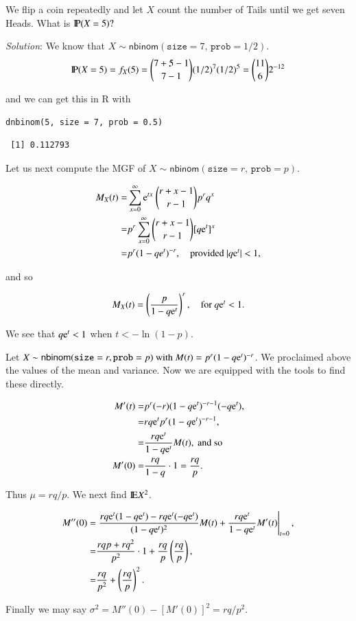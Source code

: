 \documentclass[captions=tableheading]{scrbook}
\begin{document}
\begin{example}
We flip a coin repeatedly and let \(X\) count the number of Tails until we get seven Heads. What is \(\P(X=5)?\)

\emph{Solution}: We know that \(X\sim\mathsf{nbinom}(\mathtt{size}=7,\,\mathtt{prob}=1/2)\).
\[
\P(X=5)=f_{X}(5)={7+5-1 \choose 7-1}(1/2)^{7}(1/2)^{5}={11 \choose 6}2^{-12}
\]

and we can get this in \textsf{R} with


\begin{verbatim}
dnbinom(5, size = 7, prob = 0.5)
\end{verbatim}

\begin{verbatim}
 [1] 0.112793
\end{verbatim}

Let us next compute the MGF of \(X\sim\mathsf{nbinom}(\mathtt{size}=r,\,\mathtt{prob}=p)\).

\begin{alignat*}{1}
M_{X}(t)= & \sum_{x=0}^{\infty}\me^{tx}\ {r+x-1 \choose r-1}p^{r}q^{x}\\
= & p^{r}\sum_{x=0}^{\infty}{r+x-1 \choose r-1}[q\me^{t}]^{x}\\
= & p^{r}(1-qe^{t})^{-r},\quad\mbox{provided \ensuremath{|q\me^{t}|<1,}}
\end{alignat*}

and so

\begin{equation}
M_{X}(t)=\left(\frac{p}{1-q\me^{t}}\right)^{r},\quad\mbox{for \ensuremath{q\me^{t}<1}}.
\end{equation}

We see that \(q\me^{t}<1\) when \(t<-\ln(1-p)\).

Let \(X\sim\mathsf{nbinom}(\mathtt{size}=r,\mathtt{prob}=p)\mbox{ with \ensuremath{M(t)=p^{r}(1-q\me^{t})^{-r}}}\). We proclaimed above the values of the mean and variance. Now we are equipped with the tools to find these directly.

\begin{alignat*}{1}
M'(t)= & p^{r}(-r)(1-q\me^{t})^{-r-1}(-q\me^{t}),\\
= & rq\me^{t}p^{r}(1-q\me^{t})^{-r-1},\\
= & \frac{rq\me^{t}}{1-q\me^{t}}M(t),\mbox{ and so }\\
M'(0)= & \frac{rq}{1-q}\cdot1=\frac{rq}{p}.
\end{alignat*}


Thus \(\mu=rq/p\). We next find \(\E X^{2}\).

\begin{alignat*}{1}
M''(0)= & \left.\frac{rq\me^{t}(1-q\me^{t})-rq\me^{t}(-q\me^{t})}{(1-q\me^{t})^{2}}M(t)+\frac{rq\me^{t}}{1-q\me^{t}}M'(t)\right|_{t=0},\\
= & \frac{rqp+rq^{2}}{p^{2}}\cdot1+\frac{rq}{p}\left(\frac{rq}{p}\right),\\
= & \frac{rq}{p^{2}}+\left(\frac{rq}{p}\right)^{2}.
\end{alignat*}

Finally we may say \( \sigma^{2} = M''(0) - [M'(0)]^{2} = rq/p^{2}. \)
\end{example}
\end{document}
